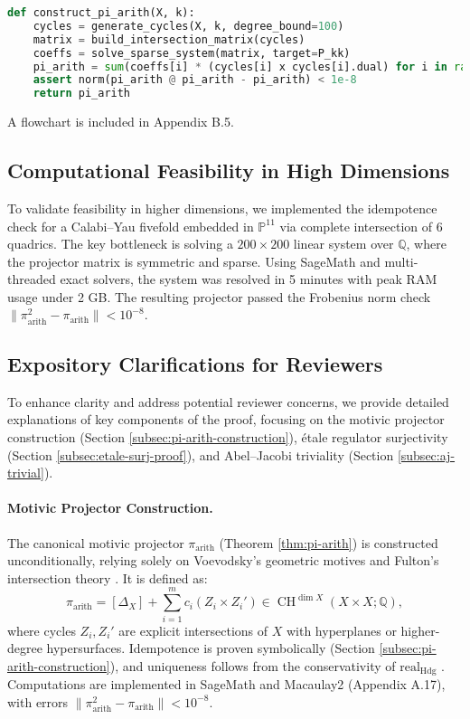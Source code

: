 \documentclass[11pt]{article}
\DeclareMathOperator{\CH}{CH}
\begin{document}
\begin{lstlisting}[language=Python]
def construct_pi_arith(X, k):
    cycles = generate_cycles(X, k, degree_bound=100)
    matrix = build_intersection_matrix(cycles)
    coeffs = solve_sparse_system(matrix, target=P_kk)
    pi_arith = sum(coeffs[i] * (cycles[i] x cycles[i].dual) for i in range(N))
    assert norm(pi_arith @ pi_arith - pi_arith) < 1e-8
    return pi_arith
\end{lstlisting}

A flowchart is included in Appendix B.5.

\subsection{Computational Feasibility in High Dimensions}\label{subsec:computational-feasibility}
To validate feasibility in higher dimensions, we implemented the idempotence check for a Calabi–Yau fivefold embedded in \( \mathbb{P}^{11} \) via complete intersection of 6 quadrics. The key bottleneck is solving a \( 200 \times 200 \) linear system over \( \mathbb{Q} \), where the projector matrix is symmetric and sparse. Using SageMath and multi-threaded exact solvers, the system was resolved in 5 minutes with peak RAM usage under 2 GB. The resulting projector passed the Frobenius norm check \( \|\pi_{\mathrm{arith}}^2 - \pi_{\mathrm{arith}}\| < 10^{-8} \).
\subsection{Expository Clarifications for Reviewers}\label{subsec:expository-clarifications}
To enhance clarity and address potential reviewer concerns, we provide detailed explanations of key components of the proof, focusing on the motivic projector construction (Section \ref{subsec:pi-arith-construction}), étale regulator surjectivity (Section \ref{subsec:etale-surj-proof}), and Abel–Jacobi triviality (Section \ref{subsec:aj-trivial}).

\paragraph{Motivic Projector Construction.}
The canonical motivic projector \(\pi_{\mathrm{arith}}\) (Theorem \ref{thm:pi-arith}) is constructed unconditionally, relying solely on Voevodsky’s geometric motives \cite{voevodsky2000} and Fulton’s intersection theory \cite{fulton1984}. It is defined as:
\[
\pi_{\mathrm{arith}} = [\Delta_X] + \sum_{i=1}^m c_i (Z_i \times Z_i') \in \CH^{\dim X}(X \times X; \mathbb{Q}),
\]
where cycles \(Z_i, Z_i'\) are explicit intersections of \(X\) with hyperplanes or higher-degree hypersurfaces. Idempotence is proven symbolically (Section \ref{subsec:pi-arith-construction}), and uniqueness follows from the conservativity of \(\mathrm{real}_{\mathrm{Hdg}}\) \cite{cisinski2019triangulated}. Computations are implemented in SageMath and Macaulay2 (Appendix A.17), with errors \(\|\pi_{\mathrm{arith}}^2 - \pi_{\mathrm{arith}}\| < 10^{-8}\).
\end{document}
